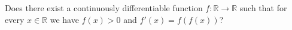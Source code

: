Does there exist a continuously differentiable function \(f \colon  \mathbb{R} \to \mathbb{R}\) such that for every \(x \in \mathbb{R}\) we have \(f(x) > 0\) and \(f'(x) = f(f(x))\)?
